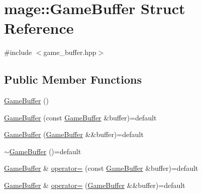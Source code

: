 \hypertarget{structmage_1_1_game_buffer}{}\section{mage\+:\+:Game\+Buffer Struct Reference}
\label{structmage_1_1_game_buffer}


{\ttfamily \#include $<$game\+\_\+buffer.\+hpp$>$}

\subsection*{Public Member Functions}
\begin{DoxyCompactItemize}
\item 
\hyperlink{structmage_1_1_game_buffer_ade6ea6f9d04f829d990b848f9e210349}{Game\+Buffer} ()
\item 
\hyperlink{structmage_1_1_game_buffer_a654d6f8d44dcc00b6693840125fb81ff}{Game\+Buffer} (const \hyperlink{structmage_1_1_game_buffer}{Game\+Buffer} \&buffer)=default
\item 
\hyperlink{structmage_1_1_game_buffer_a012cbf18353f056094ebc27d19f93ad1}{Game\+Buffer} (\hyperlink{structmage_1_1_game_buffer}{Game\+Buffer} \&\&buffer)=default
\item 
\hyperlink{structmage_1_1_game_buffer_ac1ae097a91a446184b71bb4dd9acf8b4}{$\sim$\+Game\+Buffer} ()=default
\item 
\hyperlink{structmage_1_1_game_buffer}{Game\+Buffer} \& \hyperlink{structmage_1_1_game_buffer_aa21f68c930b1c180aaaeeee95854b021}{operator=} (const \hyperlink{structmage_1_1_game_buffer}{Game\+Buffer} \&buffer)=default
\item 
\hyperlink{structmage_1_1_game_buffer}{Game\+Buffer} \& \hyperlink{structmage_1_1_game_buffer_af699a10b932a9f766acb990edefa03a5}{operator=} (\hyperlink{structmage_1_1_game_buffer}{Game\+Buffer} \&\&buffer)=default
\end{DoxyCompactItemize}
